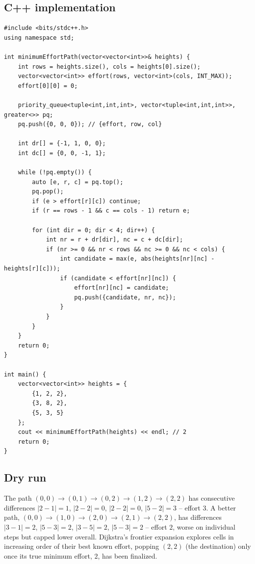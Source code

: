 \subsection*{C++ implementation}

\begin{lstlisting}
#include <bits/stdc++.h>
using namespace std;

int minimumEffortPath(vector<vector<int>>& heights) {
    int rows = heights.size(), cols = heights[0].size();
    vector<vector<int>> effort(rows, vector<int>(cols, INT_MAX));
    effort[0][0] = 0;

    priority_queue<tuple<int,int,int>, vector<tuple<int,int,int>>, greater<>> pq;
    pq.push({0, 0, 0}); // {effort, row, col}

    int dr[] = {-1, 1, 0, 0};
    int dc[] = {0, 0, -1, 1};

    while (!pq.empty()) {
        auto [e, r, c] = pq.top();
        pq.pop();
        if (e > effort[r][c]) continue;
        if (r == rows - 1 && c == cols - 1) return e;

        for (int dir = 0; dir < 4; dir++) {
            int nr = r + dr[dir], nc = c + dc[dir];
            if (nr >= 0 && nr < rows && nc >= 0 && nc < cols) {
                int candidate = max(e, abs(heights[nr][nc] - heights[r][c]));
                if (candidate < effort[nr][nc]) {
                    effort[nr][nc] = candidate;
                    pq.push({candidate, nr, nc});
                }
            }
        }
    }
    return 0;
}

int main() {
    vector<vector<int>> heights = {
        {1, 2, 2},
        {3, 8, 2},
        {5, 3, 5}
    };
    cout << minimumEffortPath(heights) << endl; // 2
    return 0;
}
\end{lstlisting}

\subsection*{Dry run}


The path $(0,0)\to(0,1)\to(0,2)\to(1,2)\to(2,2)$ has consecutive
differences $|2{-}1|=1$, $|2{-}2|=0$, $|2{-}2|=0$, $|5{-}2|=3$ --
effort $3$. A better path,
$(0,0)\to(1,0)\to(2,0)\to(2,1)\to(2,2)$, has differences
$|3{-}1|=2$, $|5{-}3|=2$, $|3{-}5|=2$, $|5{-}3|=2$ -- effort $2$,
worse on individual steps but capped lower overall. Dijkstra's
frontier expansion explores cells in increasing order of their best
known effort, popping $(2,2)$ (the destination) only once its true
minimum effort, $2$, has been finalized.

